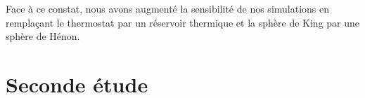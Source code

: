 



	Face à ce constat, nous avons augmenté la sensibilité de nos simulations en remplaçant le thermostat par un réservoir thermique et la
	sphère de King par une sphère de Hénon.



\section{Seconde étude}

